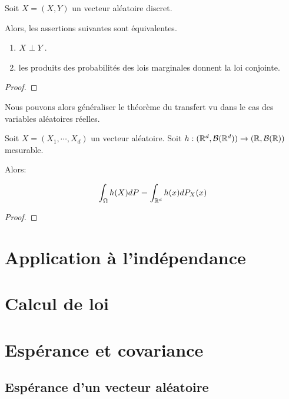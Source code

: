 \begin{corollary}
	Soit $X = (X, Y)$ un vecteur aléatoire discret.

	Alors, les assertions suivantes sont équivalentes.
	\begin{enumerate}
		\item $X \perp Y$.
		\item les produits des probabilités des lois marginales donnent la loi
			conjointe.
	\end{enumerate}
\end{corollary}

\ifdefined\outputproof
\begin{proof}

\end{proof}
\fi

Nous pouvons alors généraliser le théorème du transfert vu dans le cas des
variables aléatoires réelles.

\begin{theorem} 
	Soit $X = (X_{1}, \cdots, X_{d})$ un vecteur aléatoire.
	Soit $h : (\mathbb{R}^{d}, \mathcal{B}(\mathbb{R}^{d})) \rightarrow (\mathbb{R},
	\mathcal{B}(\mathbb{R}))$ mesurable.

	Alors:

	\begin{equation}
		\int_{\Omega} h(X) dP = \int_{\mathbb{R}^{d}} h(x) dP_{X}(x)
	\end{equation}
	\label{theorem:transfert_vecteur_aleatoire}
\end{theorem}

\ifdefined\outputproof
\begin{proof}

\end{proof}
\fi


\section{Application à l'indépendance}


\section{Calcul de loi}

\section{Espérance et covariance}

\subsection{Espérance d'un vecteur aléatoire}

